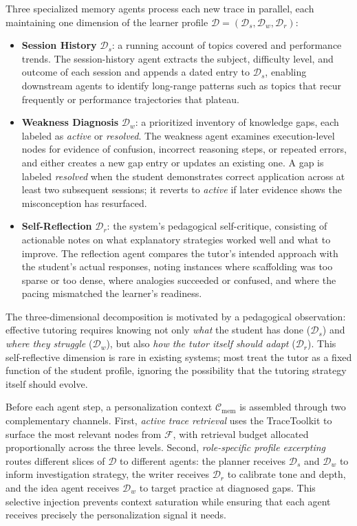 Three specialized memory agents process each new trace in parallel, each maintaining one dimension of the learner profile $\mathcal{D} = (\mathcal{D}_s, \mathcal{D}_w, \mathcal{D}_r)$:
\begin{itemize}[nosep,leftmargin=*]
\item \textbf{Session History} $\mathcal{D}_s$: a running account of topics covered and performance trends.
The session-history agent extracts the subject, difficulty level, and outcome of each session and appends a dated entry to $\mathcal{D}_s$, enabling downstream agents to identify long-range patterns such as topics that recur frequently or performance trajectories that plateau.
\item \textbf{Weakness Diagnosis} $\mathcal{D}_w$: a prioritized inventory of knowledge gaps, each labeled as \emph{active} or \emph{resolved}.
The weakness agent examines execution-level nodes for evidence of confusion, incorrect reasoning steps, or repeated errors, and either creates a new gap entry or updates an existing one.
A gap is labeled \emph{resolved} when the student demonstrates correct application across at least two subsequent sessions; it reverts to \emph{active} if later evidence shows the misconception has resurfaced.
\item \textbf{Self-Reflection} $\mathcal{D}_r$: the system's pedagogical self-critique, consisting of actionable notes on what explanatory strategies worked well and what to improve.
The reflection agent compares the tutor's intended approach with the student's actual responses, noting instances where scaffolding was too sparse or too dense, where analogies succeeded or confused, and where the pacing mismatched the learner's readiness.
\end{itemize}

The three-dimensional decomposition is motivated by a pedagogical observation: effective tutoring requires knowing not only \emph{what} the student has done ($\mathcal{D}_s$) and \emph{where they struggle} ($\mathcal{D}_w$), but also \emph{how the tutor itself should adapt} ($\mathcal{D}_r$).
This self-reflective dimension is rare in existing systems; most treat the tutor as a fixed function of the student profile, ignoring the possibility that the tutoring strategy itself should evolve.

Before each agent step, a personalization context $\mathcal{C}_{\text{mem}}$ is assembled through two complementary channels.
First, \emph{active trace retrieval} uses the TraceToolkit to surface the most relevant nodes from $\mathcal{F}$, with retrieval budget allocated proportionally across the three levels.
Second, \emph{role-specific profile excerpting} routes different slices of $\mathcal{D}$ to different agents: the planner receives $\mathcal{D}_s$ and $\mathcal{D}_w$ to inform investigation strategy, the writer receives $\mathcal{D}_r$ to calibrate tone and depth, and the idea agent receives $\mathcal{D}_w$ to target practice at diagnosed gaps.
This selective injection prevents context saturation while ensuring that each agent receives precisely the personalization signal it needs.

